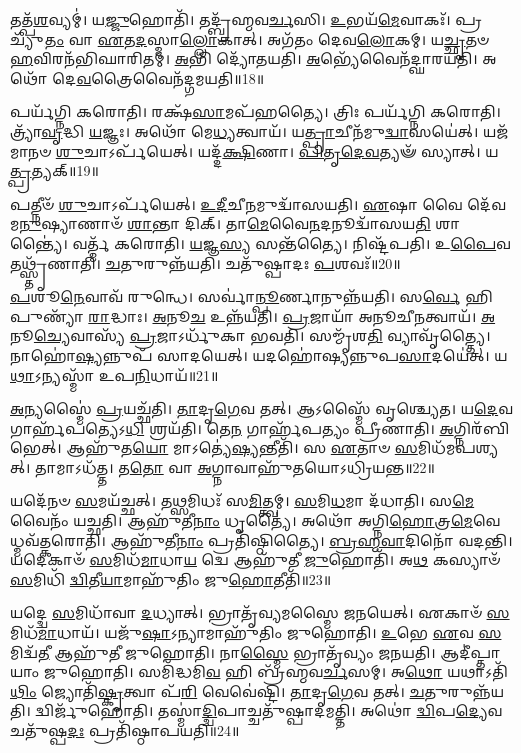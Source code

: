 𑌤𑌤𑍍𑌪᳴\-\ul{𑌶}\-𑌵𑍍𑌯𑌮𑍍॑।
𑌯\-\ul{𑌜𑍍𑌜𑍁}\-𑌹𑍋𑌤𑌿᳴।
𑌤𑌦𑍍𑌬𑍍𑌰᳴𑌹𑍍𑌮𑌵\-\ul{𑌰𑍍𑌚}\-𑌸𑌿।
\-\ul{𑌉}\-𑌭𑌯᳴\-\ul{𑌮𑍇}\-𑌵𑌾𑌕𑌃᳴।
𑌪𑍍𑌰𑌚𑍍𑌯𑍁᳴\-\ul{𑌤𑌂} 𑌵𑌾 \ul{𑌏}\-𑌤\-\ul{𑌦}\-𑌸𑍍𑌮𑌾\-\ul{𑌲𑍍𑌲𑍋}\-𑌕𑌾𑌤𑍍।
𑌅𑌗᳴𑌤𑌂 𑌦𑍇𑌵\-\ul{𑌲𑍋}\-𑌕𑌮𑍍।
𑌯\-\ul{𑌚𑍍𑌛𑍃}\-𑌤𑍞 \ul{𑌹}\-𑌵𑌿𑌰𑌨᳴𑌭𑌿𑌘𑌾𑌰𑌿𑌤𑌮𑍍।
\-\ul{𑌅}\-𑌭𑌿 𑌦𑍍𑌯𑍋᳴𑌤𑌯𑌤𑌿।
\-\ul{𑌅}\-𑌭𑍍𑌯𑍇᳴𑌵𑍈𑌨᳴𑌦𑍍\mbox{}𑌘𑌾𑌰𑌯𑌤𑌿।
𑌅𑌥𑍋᳴ 𑌦𑍇\-\ul{𑌵}\-𑌤𑍍𑌰𑍈𑌵𑍈𑌨᳴𑌦𑍍𑌗𑌮𑌯𑌤𑌿॥18॥

𑌪𑌰𑍍𑌯᳴𑌗𑍍𑌨𑌿 𑌕𑌰𑍋𑌤𑌿।
𑌰𑌕𑍍𑌷᳴\-\ul{𑌸𑌾}\-𑌮𑌪᳴𑌹𑌤𑍍𑌯𑍈।
𑌤𑍍𑌰𑌿𑌃 𑌪𑌰𑍍𑌯᳴𑌗𑍍𑌨𑌿 𑌕𑌰𑍋𑌤𑌿।
𑌤𑍍𑌰𑍍𑌯𑌾᳴\-\ul{𑌵𑍃}\-𑌦𑍍𑌧𑌿 \ul{𑌯}\-𑌜𑍍𑌞𑌃।
𑌅𑌥𑍋᳴ 𑌮𑍇\-\ul{𑌧𑍍𑌯}\-𑌤𑍍𑌵𑌾𑌯᳴।
𑌯\-\ul{𑌤𑍍𑌪𑍍𑌰𑌾}\-𑌚𑍀𑌨᳴𑌮𑍁\-\ul{𑌦𑍍𑌵𑌾}\-𑌸𑌯𑍇॑𑌤𑍍।
𑌯𑌜᳴𑌮𑌾𑌨𑍞 \ul{𑌶𑍁}\-𑌚𑌾\-𑌽𑌰𑍍𑌪᳴𑌯𑍇𑌤𑍍।
𑌯𑌦𑍍𑌦᳴\-\ul{𑌕𑍍𑌷𑌿}\-𑌣𑌾।
\-\ul{𑌪𑌿}\-\-\ul{𑌤𑍃}\-\-\ul{𑌦𑍇}\-\-\ul{𑌵}\-𑌤𑍍𑌯𑍟᳴ 𑌸𑍍𑌯𑌾𑌤𑍍।
𑌯\-\ul{𑌤𑍍𑌪𑍍𑌰}\-𑌤𑍍𑌯𑌕𑍍॥19॥

𑌪𑌤𑍍𑌨𑍀𑍞᳴ \ul{𑌶𑍁}\-𑌚𑌾\-𑌽𑌰𑍍𑌪᳴𑌯𑍇𑌤𑍍।
\-\ul{𑌉}\-\-\ul{𑌦𑍀}\-𑌚𑍀\-\ul{𑌨}\-𑌮𑍁𑌦𑍍𑌵𑌾᳴𑌸𑌯𑌤𑌿।
\-\ul{𑌏}\-𑌷𑌾 𑌵𑍈 𑌦𑍇᳴𑌵𑌮\-\ul{𑌨𑍁}\-𑌷𑍍𑌯𑌾𑌣𑌾𑍞᳴ \ul{𑌶𑌾}\-𑌨𑍍𑌤𑌾 𑌦𑌿𑌕𑍍।
𑌤𑌾\-\ul{𑌮𑍇}\-𑌵𑍈\-\ul{𑌨}\-𑌦𑌨𑍂𑌦𑍍𑌵𑌾᳴𑌸𑌯\-\ul{𑌤𑌿} 𑌶𑌾𑌨𑍍𑌤𑍍𑌯𑍈॑।
𑌵𑌰𑍍𑌤𑍍𑌮᳴ 𑌕𑌰𑍋𑌤𑌿।
\-\ul{𑌯}\-𑌜𑍍𑌞\-\ul{𑌸𑍍𑌯} 𑌸𑌨𑍍𑌤᳴𑌤𑍍𑌯𑍈।
𑌨𑌿𑌷𑍍𑌟᳴𑌪𑌤𑌿।
𑌉\-\ul{𑌪𑍈}\-𑌵 𑌤𑌥𑍍𑌸𑍍𑌤𑍃᳴𑌣𑌾𑌤𑌿।
\-\ul{𑌚}\-𑌤𑍁𑌰𑍁𑌨𑍍𑌨᳴𑌯𑌤𑌿।
𑌚𑌤𑍁᳴𑌷𑍍𑌪𑌾𑌦𑌃 \ul{𑌪}\-𑌶𑌵𑌃᳴॥20॥

\-\ul{𑌪}\-𑌶𑍂\-\ul{𑌨𑍇}\-𑌵𑌾𑌵᳴ 𑌰𑍁𑌨𑍍𑌧𑍇।
𑌸𑌰𑍍𑌵𑌾॑\-\ul{𑌨𑍍𑌪𑍂}\-𑌰𑍍𑌣𑌾𑌨𑍁𑌨𑍍𑌨᳴𑌯𑌤𑌿।
𑌸\-\ul{𑌰𑍍𑌵𑍇} 𑌹𑌿 𑌪𑍁𑌣𑍍𑌯𑌾᳴ \ul{𑌰𑌾}\-𑌦𑍍𑌧𑌾𑌃।
\-\ul{𑌅}\-𑌨𑍂\-\ul{𑌚} 𑌉𑌨𑍍𑌨᳴𑌯𑌤𑌿।
\-\ul{𑌪𑍍𑌰}\-𑌜𑌾𑌯𑌾᳴ 𑌅𑌨𑍂𑌚𑍀\-\ul{𑌨}\-𑌤𑍍𑌵𑌾𑌯᳴।
\-\ul{𑌅}\-𑌨𑍂\-\ul{𑌚𑍍𑌯𑍇}\-𑌵𑌾𑌸𑍍𑌯᳴ \ul{𑌪𑍍𑌰}\-𑌜𑌾\-𑌽𑌰𑍍𑌧𑍁᳴𑌕𑌾 𑌭𑌵𑌤𑌿।
𑌸𑌮𑍍𑌮𑍃᳴𑌶\-\ul{𑌤𑌿} 𑌵𑍍𑌯𑌾𑌵𑍃᳴𑌤𑍍𑌤𑍍𑌯𑍈।
𑌨𑌾𑌹𑍋॑\-\ul{𑌷𑍍𑌯}\-𑌨𑍍𑌨𑍁𑌪᳴ 𑌸𑌾𑌦𑌯𑍇𑌤𑍍।
𑌯𑌦𑌹𑍋॑𑌷𑍍𑌯𑌨𑍍𑌨𑍁𑌪\-\ul{𑌸𑌾}\-𑌦𑌯𑍇॑𑌤𑍍।
𑌯\-\ul{𑌥𑌾}\-𑌽𑌨𑍍𑌯𑌸𑍍𑌮𑌾᳴ 𑌉𑌪\-\ul{𑌨𑌿}\-𑌧𑌾𑌯᳴॥21॥

\-\ul{𑌅}\-𑌨𑍍𑌯𑌸𑍍𑌮𑍈॑ \ul{𑌪𑍍𑌰}\-𑌯𑌚𑍍𑌛᳴𑌤𑌿।
\-\ul{𑌤𑌾}\-𑌦𑍃\-\ul{𑌗𑍇}\-𑌵 𑌤𑌤𑍍।
𑌆𑌽𑌸𑍍𑌮𑍈᳴ 𑌵𑍃𑌶𑍍𑌚𑍍𑌯𑍇𑌤।
𑌯\-\ul{𑌦𑍇}\-𑌵 𑌗𑌾𑌰𑍍\mbox{}𑌹᳴𑌪𑌤𑍍𑌯𑍇𑌽\-\ul{𑌧𑌿} 𑌶𑍍𑌰𑌯᳴𑌤𑌿।
𑌤𑍇\-\ul{𑌨} 𑌗𑌾𑌰𑍍\mbox{}𑌹᳴𑌪𑌤𑍍𑌯𑌂 𑌪𑍍𑌰𑍀𑌣𑌾𑌤𑌿।
\-\ul{𑌅}\-𑌗𑍍𑌨𑌿𑌰᳴𑌬𑌿𑌭𑍇𑌤𑍍।
𑌆𑌹𑍁᳴𑌤\-\ul{𑌯𑍋} 𑌮𑌾𑌽𑌤𑍍𑌯𑍇॑\-\ul{𑌷𑍍𑌯}\-𑌨𑍍𑌤𑍀𑌤𑌿᳴।
𑌸 \ul{𑌏}\-𑌤𑌾𑍞 \ul{𑌸}\-𑌮𑌿𑌧᳴𑌮𑌪𑌶𑍍𑌯𑌤𑍍।
𑌤𑌾𑌮𑌾𑌽𑌧᳴𑌤𑍍𑌤।
𑌤\-\ul{𑌤𑍋} 𑌵𑌾 \ul{𑌅}\-𑌗𑍍𑌨𑌾𑌵𑌾𑌹𑍁᳴𑌤𑌯𑍋\-𑌽𑌧𑍍𑌰𑌿𑌯𑌨𑍍𑌤॥22॥

𑌯𑌦𑍇᳴𑌨𑍞 \ul{𑌸}\-𑌮𑌯᳴𑌚𑍍𑌛𑌤𑍍।
𑌤\-\ul{𑌥𑍍𑌸}\-𑌮𑌿𑌧𑌃᳴ 𑌸\-\ul{𑌮𑌿}\-𑌤𑍍𑌤𑍍𑌵𑌮𑍍।
\-\ul{𑌸}\-𑌮𑌿\-\ul{𑌧}\-𑌮𑌾 𑌦᳴𑌧𑌾𑌤𑌿।
𑌸\-\ul{𑌮𑍇}\-𑌵𑍈𑌨𑌂᳴ 𑌯𑌚𑍍𑌛𑌤𑌿।
𑌆𑌹𑍁᳴𑌤𑍀\-\ul{𑌨𑌾𑌂} 𑌧𑍃𑌤𑍍𑌯𑍈॑।
𑌅𑌥𑍋᳴ 𑌅𑌗𑍍𑌨𑌿\-\ul{𑌹𑍋}\-𑌤𑍍𑌰\-\ul{𑌮𑍇}\-𑌵𑍇𑌧𑍍𑌮𑌵᳴𑌤𑍍𑌕𑌰𑍋𑌤𑌿।
𑌆𑌹𑍁᳴𑌤𑍀\-\ul{𑌨𑌾𑌂} 𑌪𑍍𑌰𑌤𑌿᳴\-𑌷𑍍𑌠𑌿𑌤𑍍𑌯𑍈।
\-\ul{𑌬𑍍𑌰}\-\-\ul{𑌹𑍍𑌮}\-\-\ul{𑌵𑌾}\-𑌦𑌿𑌨𑍋᳴ 𑌵𑌦𑌨𑍍𑌤𑌿।
𑌯𑌦𑍇𑌕𑌾𑍞᳴ \ul{𑌸}\-𑌮𑌿𑌧᳴\-\ul{𑌮𑌾}\-𑌧𑌾\-\ul{𑌯} 𑌦𑍍𑌵𑍇 𑌆𑌹𑍁᳴𑌤𑍀 \ul{𑌜𑍁}\-𑌹𑍋𑌤𑌿᳴।
𑌅\-\ul{𑌥} 𑌕𑌸𑍍𑌯𑌾𑍞᳴ \ul{𑌸}\-𑌮𑌿𑌧𑌿᳴ \ul{𑌦𑍍𑌵𑌿}\-𑌤𑍀\-\ul{𑌯𑌾}\-𑌮𑌾𑌹𑍁᳴𑌤𑌿𑌂 𑌜𑍁\-\ul{𑌹𑍋}\-𑌤𑍀𑌤𑌿᳴॥23॥

𑌯𑌦𑍍𑌦𑍍𑌵𑍇 \ul{𑌸}\-𑌮𑌿𑌧𑌾᳴𑌵𑌾 \ul{𑌦}\-𑌧𑍍𑌯𑌾𑌤𑍍।
𑌭𑍍𑌰𑌾𑌤𑍃᳴𑌵𑍍𑌯𑌮𑌸𑍍𑌮𑍈 𑌜𑌨𑌯𑍇𑌤𑍍।
𑌏𑌕𑌾𑍞᳴ \ul{𑌸}\-𑌮𑌿𑌧᳴\-\ul{𑌮𑌾}\-𑌧𑌾𑌯᳴।
𑌯𑌜𑍁᳴\-\ul{𑌷𑌾}\-\-𑌽𑌨𑍍𑌯𑌾𑌮𑌾𑌹𑍁᳴𑌤𑌿𑌂 𑌜𑍁𑌹𑍋𑌤𑌿।
\-\ul{𑌉}\-𑌭𑍇 \ul{𑌏}\-𑌵 \ul{𑌸}\-𑌮𑌿𑌦𑍍𑌵᳴\-\ul{𑌤𑍀} 𑌆𑌹𑍁᳴𑌤𑍀 𑌜𑍁𑌹𑍋𑌤𑌿।
𑌨𑌾\-\ul{𑌸𑍍𑌮𑍈} 𑌭𑍍𑌰𑌾𑌤𑍃᳴𑌵𑍍𑌯𑌂 𑌜𑌨𑌯𑌤𑌿।
𑌆𑌦𑍀॑𑌪𑍍𑌤𑌾𑌯𑌾𑌂 𑌜𑍁𑌹𑍋𑌤𑌿।
𑌸𑌮𑌿᳴𑌦𑍍𑌧𑌮𑌿\-\ul{𑌵} 𑌹𑌿 𑌬𑍍𑌰᳴𑌹𑍍𑌮𑌵\-\ul{𑌰𑍍𑌚}\-𑌸𑌮𑍍।
𑌅\-\ul{𑌥𑍋} 𑌯𑌥𑌾\-𑌽𑌤𑌿᳴\-\ul{𑌥𑌿𑌂} 𑌜𑍍𑌯𑍋𑌤𑌿᳴\-\ul{𑌷𑍍𑌕𑍃}\-𑌤𑍍𑌵𑌾 𑌪᳴\-\ul{𑌰𑌿} 𑌵𑍇𑌵𑍇॑𑌷𑍍𑌟𑌿।
\-\ul{𑌤𑌾}\-𑌦𑍃\-\ul{𑌗𑍇}\-𑌵 𑌤𑌤𑍍।
\-\ul{𑌚}\-𑌤𑍁𑌰𑍁𑌨𑍍𑌨᳴𑌯𑌤𑌿।
𑌦𑍍𑌵𑌿𑌰𑍍𑌜𑍁᳴𑌹𑍋𑌤𑌿।
𑌤𑌸𑍍𑌮𑌾॑\-\ul{𑌦𑍍𑌦𑍍𑌵𑌿}\-𑌪𑌾𑌚𑍍𑌚𑌤𑍁᳴𑌷𑍍𑌪𑌾𑌦𑌮𑌤𑍍𑌤𑌿।
𑌅𑌥𑍋॑ \ul{𑌦𑍍𑌵𑌿}\-𑌪\-\ul{𑌦𑍍𑌯𑍇}\-𑌵 𑌚𑌤𑍁᳴𑌷𑍍𑌪\-\ul{𑌦𑌃} 𑌪𑍍𑌰𑌤𑌿᳴\-𑌷𑍍𑌠𑌾𑌪𑌯𑌤𑌿॥24॥\anuvakamend[\-\ul{𑌭}\-\-\ul{𑌵}\-\-\ul{𑌤𑌿} \ul{𑌪𑍍𑌰}\-\-\ul{𑌤𑌿}\-\-\ul{𑌷𑌿}\-𑌞𑍍𑌚𑌤𑌿᳴ 𑌗𑌮𑌯𑌤𑌿 \ul{𑌪𑍍𑌰}\-𑌤𑍍𑌯\-\ul{𑌕𑍍𑌪}\-𑌶𑌵᳴ 𑌉𑌪\-\ul{𑌨𑌿}\-𑌧𑌾𑌯𑌾॑𑌧𑍍𑌰𑌿\-\ul{𑌯}\-𑌨𑍍𑌤𑍇\-\ul{𑌤𑌿} 𑌤\-\ul{𑌚𑍍𑌚}\-𑌤𑍍𑌵𑌾𑌰𑌿᳴ 𑌚]

